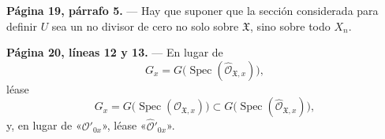 \noindent\textbf{Página 19, párrafo 5.} --- Hay que suponer que la sección
considerada para definir $U$ sea un no divisor de cero no solo sobre
$\mathfrak X$, sino sobre todo $X_n$.

\noindent\textbf{Página 20, líneas 12 y 13.} --- En lugar de
\[
  G_x=G\bigl(\operatorname{Spec}(\widehat{\mathcal O}_{\mathfrak X,x})\bigr),
\]
léase
\[
  G_x=G\bigl(\operatorname{Spec}(\mathcal O_{\mathfrak X,x})\bigr)
  \subset
  G\bigl(\operatorname{Spec}(\widehat{\mathcal O}_{\mathfrak X,x})\bigr),
\]
y, en lugar de «$\mathcal O'_{0x}$», léase
«$\widehat{\mathcal O}'_{0x}$».
